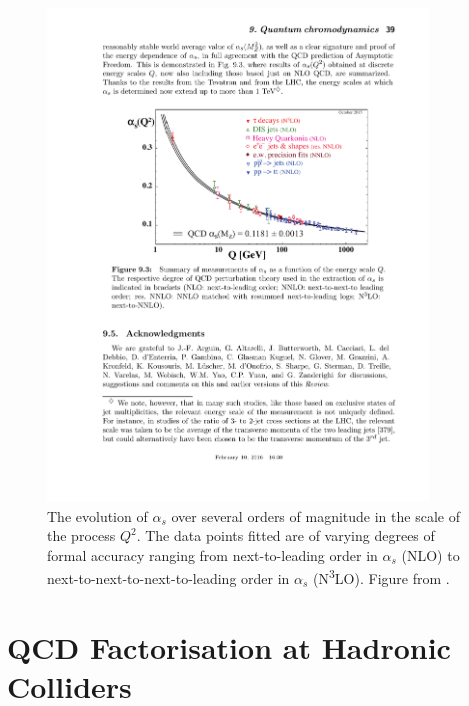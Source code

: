 	\begin{figure}[htp]
		\centering
		\includegraphics[width=0.9\textwidth]{Figures/runningAlphaS}
		\caption{The evolution of $\alpha_s$ over several orders of magnitude in the scale of the process $Q^2$.  The data
		         points fitted are of varying degrees of formal accuracy ranging from next-to-leading order in $\alpha_s$
		         (NLO) to next-to-next-to-next-to-leading order in $\alpha_s$ (N\textsuperscript{3}LO).
		         Figure from \cite{Beringer:1900zz}.}
		\label{fig:runningAS}
  	\end{figure}

\section{QCD Factorisation at Hadronic Colliders}


